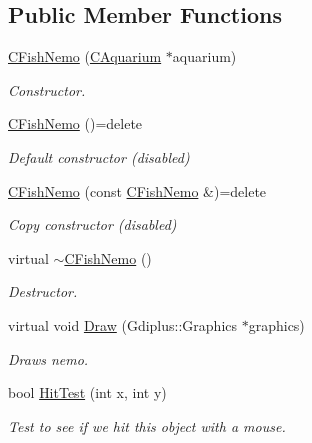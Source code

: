 \subsection*{Public Member Functions}
\begin{DoxyCompactItemize}
\item 
\hyperlink{class_c_fish_nemo_ab5cc8d119b0c9d8dc62a0e2b6f6e731d}{C\+Fish\+Nemo} (\hyperlink{class_c_aquarium}{C\+Aquarium} $\ast$aquarium)
\begin{DoxyCompactList}\small\item\em Constructor. \end{DoxyCompactList}\item 
\mbox{\label{class_c_fish_nemo_abb741271acb8aeb31fea93f5048d171e}} 
\hyperlink{class_c_fish_nemo_abb741271acb8aeb31fea93f5048d171e}{C\+Fish\+Nemo} ()=delete
\begin{DoxyCompactList}\small\item\em Default constructor (disabled) \end{DoxyCompactList}\item 
\mbox{\label{class_c_fish_nemo_a354e7fcb47bbf51c30c148c77dfbb59b}} 
\hyperlink{class_c_fish_nemo_a354e7fcb47bbf51c30c148c77dfbb59b}{C\+Fish\+Nemo} (const \hyperlink{class_c_fish_nemo}{C\+Fish\+Nemo} \&)=delete
\begin{DoxyCompactList}\small\item\em Copy constructor (disabled) \end{DoxyCompactList}\item 
virtual \hyperlink{class_c_fish_nemo_ac37da91b4738144d3b47674450861b26}{$\sim$\+C\+Fish\+Nemo} ()
\begin{DoxyCompactList}\small\item\em Destructor. \end{DoxyCompactList}\item 
virtual void \hyperlink{class_c_fish_nemo_a56389067cff39be91a796f42529458d3}{Draw} (Gdiplus\+::\+Graphics $\ast$graphics)
\begin{DoxyCompactList}\small\item\em Draws nemo. \end{DoxyCompactList}\item 
bool \hyperlink{class_c_fish_nemo_a7ab85960d0a36a80cd6bf7fb78afe0ee}{Hit\+Test} (int x, int y)
\begin{DoxyCompactList}\small\item\em Test to see if we hit this object with a mouse. \end{DoxyCompactList}\end{DoxyCompactItemize}
